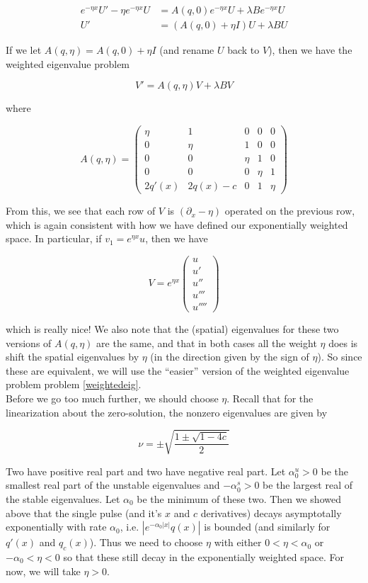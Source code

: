\documentclass[12pt]{article}
\begin{document}
\begin{align*}
e^{-\eta x} U' - \eta e^{-\eta x}U &= A(q, 0)e^{-\eta x}U + \lambda B e^{-\eta x}U \\
U' &= (A(q, 0) + \eta I) U + \lambda B U
\end{align*}

If we let $A(q, \eta) = A(q, 0) + \eta I$ (and rename $U$ back to $V$), then we have the weighted eigenvalue problem

\begin{equation}\label{weightedeig}
V' = A(q, \eta)V + \lambda B V
\end{equation}

where

\[
A(q, \eta) = \begin{pmatrix}\eta & 1 & 0 & 0 & 0 \\0 & \eta & 1 & 0 & 0 \\0 & 0 & \eta & 1 & 0 \\0 & 0 & 0 & \eta & 1 \\
2q'(x) & 2q(x) - c & 0 & 1 & \eta \end{pmatrix} 
\]

From this, we see that each row of $V$ is $(\partial_x - \eta)$ operated on the previous row, which is again consistent with how we have defined our exponentially weighted space. In particular, if $v_1 = e^{\eta x} u$, then we have

\[
V = e^{\eta x}\begin{pmatrix}u\\u'\\u''\\u'''\\u'''' \end{pmatrix}
\] 

which is really nice! We also note that the (spatial) eigenvalues for these two versions of $A(q, \eta)$ are the same, and that in both cases all the weight $\eta$ does is shift the spatial eigenvalues by $\eta$ (in the direction given by the sign of $\eta$). So since these are equivalent, we will use the ``easier'' version of the weighted eigenvalue problem problem \eqref{weightedeig}.\\

Before we go too much further, we should choose $\eta$. Recall that for the linearization about the zero-solution, the nonzero eigenvalues are given by

\[
\nu = \pm \sqrt{ \frac{1 \pm \sqrt{1 - 4c} }{2}}
\]

Two have positive real part and two have negative real part. Let $\alpha^u_0 > 0$ be the smallest real part of the unstable eigenvalues and $-\alpha^s_0 > 0$ be the largest real of the stable eigenvalues. Let $\alpha_0$ be the minimum of these two. Then we showed above that the single pulse (and it's $x$ and $c$ derivatives) decays asymptotally exponentially with rate $\alpha_0$, i.e. $|e^{-\alpha_0 |x|} q(x)|$ is bounded (and similarly for $q'(x)$ and $q_c(x)$). Thus we need to choose $\eta$ with either $0 < \eta < \alpha_0$ or $-\alpha_0 < \eta < 0$ so that these still decay in the exponentially weighted space. For now, we will take $\eta > 0$. \\
\end{document}
